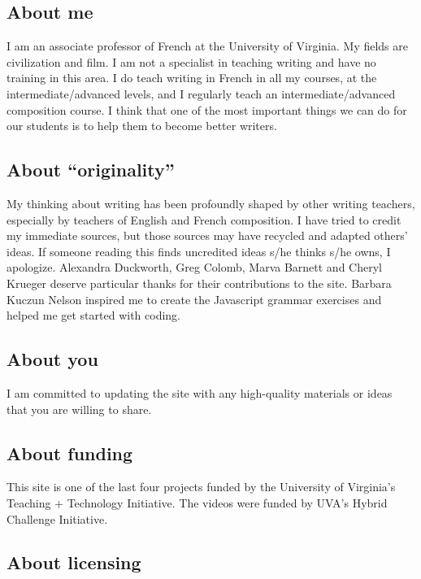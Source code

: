 \documentclass[
  letterpaper,
  DIV=11,
  numbers=noendperiod]{scrreprt}
\begin{document}
\hypertarget{about-me}{%
\subsection{About me}\label{about-me}}

I am an associate professor of French at the University of Virginia. My
fields are civilization and film. I am not a specialist in teaching
writing and have no training in this area. I do teach writing in French
in all my courses, at the intermediate/advanced levels, and I regularly
teach an intermediate/advanced composition course. I think that one of
the most important things we can do for our students is to help them to
become better writers.

\hypertarget{about-originality}{%
\subsection{About ``originality''}\label{about-originality}}

My thinking about writing has been profoundly shaped by other writing
teachers, especially by teachers of English and French composition. I
have tried to credit my immediate sources, but those sources may have
recycled and adapted others' ideas. If someone reading this finds
uncredited ideas s/he thinks s/he owns, I apologize. Alexandra
Duckworth, Greg Colomb, Marva Barnett and Cheryl Krueger deserve
particular thanks for their contributions to the site. Barbara Kuczun
Nelson inspired me to create the Javascript grammar exercises and helped
me get started with coding.

\hypertarget{about-you}{%
\subsection{About you}\label{about-you}}

I am committed to updating the site with any high-quality materials or
ideas that you are willing to share.

\hypertarget{about-funding}{%
\subsection{About funding}\label{about-funding}}

This site is one of the last four projects funded by the University of
Virginia's Teaching + Technology Initiative. The videos were funded by
UVA's Hybrid Challenge Initiative.

\hypertarget{about-licensing}{%
\subsection{About licensing}\label{about-licensing}}
\end{document}
